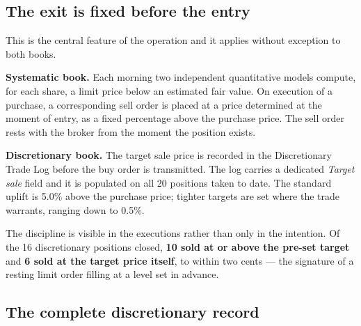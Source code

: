 \documentclass[11pt]{article}
\begin{document}
\subsection{The exit is fixed before the entry}

This is the central feature of the operation and it applies without exception to both books.

\textbf{Systematic book.} Each morning two independent quantitative models compute, for each share,
a limit price below an estimated fair value. On execution of a purchase, a corresponding sell order
is placed at a price determined at the moment of entry, as a fixed percentage above the purchase
price. The sell order rests with the broker from the moment the position exists.

\textbf{Discretionary book.} The target sale price is recorded in the Discretionary Trade Log
before the buy order is transmitted. The log carries a dedicated \emph{Target sale} field and it
is populated on all 20 positions taken to date. The standard uplift is 5.0\% above the purchase
price; tighter targets are set where the trade warrants, ranging down to 0.5\%.

The discipline is visible in the executions rather than only in the intention. Of the 16
discretionary positions closed, \textbf{10 sold at or above the pre-set target} and \textbf{6 sold
at the target price itself}, to within two cents --- the signature of a resting limit order filling
at a level set in advance.

\subsection{The complete discretionary record}
\end{document}
